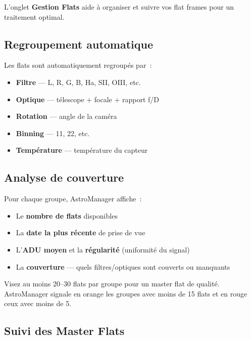 \documentclass[a4paper,11pt]{article}
\begin{document}
L'onglet \textbf{Gestion Flats} aide \`{a} organiser et suivre vos flat frames pour un traitement optimal.

\subsection{Regroupement automatique}

Les flats sont automatiquement regroup\'{e}s par~:

\begin{itemize}
    \item \textbf{Filtre} --- L, R, G, B, Ha, SII, OIII, etc.
    \item \textbf{Optique} --- t\'{e}lescope + focale + rapport f/D
    \item \textbf{Rotation} --- angle de la cam\'{e}ra
    \item \textbf{Binning} --- 1\texttimes{}1, 2\texttimes{}2, etc.
    \item \textbf{Temp\'{e}rature} --- temp\'{e}rature du capteur
\end{itemize}

\subsection{Analyse de couverture}

Pour chaque groupe, AstroManager affiche~:

\begin{itemize}
    \item Le \textbf{nombre de flats} disponibles
    \item La \textbf{date la plus r\'{e}cente} de prise de vue
    \item L'\textbf{ADU moyen} et la \textbf{r\'{e}gularit\'{e}} (uniformit\'{e} du signal)
    \item La \textbf{couverture} --- quels filtres/optiques sont couverts ou manquants
\end{itemize}

\begin{tipbox}
Visez au moins 20--30 flats par groupe pour un master flat de qualit\'{e}. AstroManager signale en orange les groupes avec moins de 15 flats et en rouge ceux avec moins de 5.
\end{tipbox}

\subsection{Suivi des Master Flats}
\end{document}

